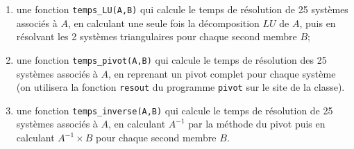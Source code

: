 	\begin{enumerate}
		
		\item une fonction \texttt{temps\_LU(A,B)} qui calcule le temps de résolution de 25 systèmes associés à $A$, en calculant une seule fois la décomposition $LU$ de $A$, puis en résolvant les 2 systèmes triangulaires pour chaque second membre $B$;
		
		\item une fonction \texttt{temps\_pivot(A,B)} qui calcule le temps de résolution des 25 systèmes associés à $A$, en reprenant un pivot complet pour chaque système (on utilisera la fonction \texttt{resout} du programme \texttt{pivot} sur le site de la classe).
		
		\item une fonction \texttt{temps\_inverse(A,B)} qui calcule le temps de résolution de 25 systèmes associés à $A$, en calculant $A^{-1}$ par la méthode du pivot puis en calculant $A^{-1}\times B$ pour chaque second membre $B$.
		
	\end{enumerate}

	
